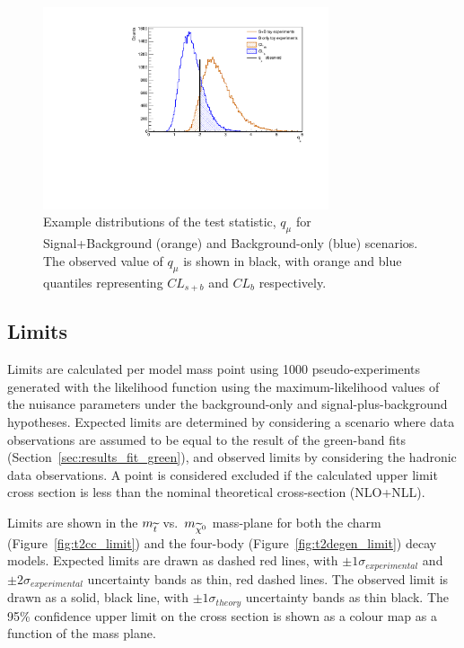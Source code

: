 \begin{figure}[t]
  \centering
  \includegraphics[width=0.75\textwidth]{Figs/other_limits/cartoon_cls_obs.pdf}
  \caption{Example distributions of the test statistic, $q_{\mu}$ for
  Signal+Background (orange) and Background-only (blue) scenarios. The observed
  value of $q_{\mu}$ is shown in black, with orange and blue quantiles
  representing $CL_{s+b}$ and $CL_{b}$ respectively.}
  \label{fig:cartoon_cls_obs}
\end{figure}

\subsection{Limits}
Limits are calculated per model mass point using 1000 pseudo-experiments generated
with the likelihood function using the maximum-likelihood values of the
nuisance parameters under the background-only and signal-plus-background hypotheses.
Expected limits are determined by considering a scenario where data observations
are assumed to be equal to the result of the green-band fits
(Section~\ref{sec:results_fit_green}), and observed
limits by considering the hadronic data observations.
A point is considered excluded if the calculated upper limit cross section is
less than the nominal theoretical cross-section (NLO+NLL).

Limits are shown in the $m_{\widetilde{t}} $ vs.\ $m_{\widetilde{\chi}^{0}}$ mass-plane for both the
charm (Figure~\ref{fig:t2cc_limit}) and the four-body
(Figure~\ref{fig:t2degen_limit}) decay models. Expected limits are drawn as
dashed red lines,
with $\pm1\sigma_{experimental}$ and $\pm2\sigma_{experimental}$ uncertainty
bands as thin, red dashed lines. The observed limit is drawn as a solid, black
line, with $\pm1\sigma_{theory}$ uncertainty bands as thin black. The 95\%
confidence upper limit on the cross section is shown as a colour map as a
function of the mass plane.

